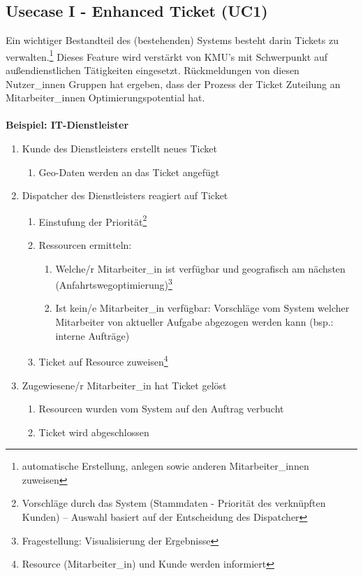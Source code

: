 \documentclass[Bachelorarbeit.tex]{subfiles}
\begin{document}
\subsection{Usecase I - Enhanced Ticket (\ac{UC}1)}
Ein wichtiger Bestandteil des (bestehenden) Systems besteht darin Tickets zu verwalten.\footnote{automatische Erstellung, anlegen sowie anderen Mitarbeiter\_innen zuweisen}
Dieses Feature wird verstärkt von \ac{KMU}’s mit Schwerpunkt auf außendienstlichen Tätigkeiten eingesetzt. 
Rückmeldungen von diesen Nutzer\_innen Gruppen hat ergeben, dass der Prozess der Ticket Zuteilung an Mitarbeiter\_innen Optimierungspotential hat. \\
\\

\textbf{Beispiel: IT-Dienstleister}
\begin{enumerate}
	\item Kunde des Dienstleisters erstellt neues Ticket
		\begin{enumerate}
			\item Geo-Daten werden an das Ticket angefügt
		\end{enumerate}
	\item Dispatcher des Dienstleisters reagiert auf Ticket
		\begin{enumerate}
			\item Einstufung der Priorität\footnote{Vorschläge durch das System (Stammdaten - Priorität des verknüpften Kunden) – Auswahl basiert auf der Entscheidung des Dispatcher}
			\item Ressourcen ermitteln:
			\begin{enumerate}
				\item Welche/r Mitarbeiter\_in ist verfügbar und geografisch am nächsten (Anfahrtswegoptimierung)\footnote{Fragestellung: Visualisierung der Ergebnisse }
				\item Ist kein/e Mitarbeiter\_in verfügbar: Vorschläge vom System welcher Mitarbeiter von aktueller Aufgabe abgezogen werden kann (bsp.: interne Aufträge)
			\end{enumerate}
			\item Ticket auf Resource zuweisen\footnote{Resource (Mitarbeiter\_in) und Kunde werden informiert}
		\end{enumerate}
	\item Zugewiesene/r Mitarbeiter\_in hat Ticket gelöst
	\begin{enumerate}
		\item Resourcen wurden vom System auf den Auftrag verbucht
		\item Ticket wird abgeschlossen
	\end{enumerate}
\end{enumerate}
\end{document}
